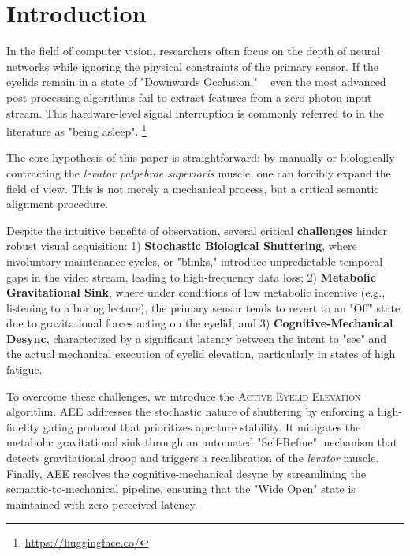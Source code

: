 \section{Introduction}
\label{sec:intro}

In the field of computer vision, researchers often focus on the depth of neural networks while ignoring the physical constraints of the primary sensor. If the eyelids remain in a state of "Downwards Occlusion," ~\citep{chen2025planning, fung2025embodied, terver2025drives, russell2025gaia, agarwal2025cosmos} even the most advanced post-processing algorithms fail to extract features from a zero-photon input stream. This hardware-level signal interruption is commonly referred to in the literature as "being asleep". \footnote{\url{https://huggingface.co/}}

The core hypothesis of this paper is straightforward: by manually or biologically contracting the \textit{levator palpebrae superioris} muscle, one can forcibly expand the field of view. This is not merely a mechanical process, but a critical semantic alignment procedure. ~\citep{alayrac2022flamingo, liu2024improved, dai2023instructblip}

Despite the intuitive benefits of observation, several critical \textbf{challenges} hinder robust visual acquisition: 1) \textbf{Stochastic Biological Shuttering}, where involuntary maintenance cycles, or "blinks," introduce unpredictable temporal gaps in the video stream, leading to high-frequency data loss; 2) \textbf{Metabolic Gravitational Sink}, where under conditions of low metabolic incentive (e.g., listening to a boring lecture), the primary sensor tends to revert to an "Off" state due to gravitational forces acting on the eyelid; and 3) \textbf{Cognitive-Mechanical Desync}, characterized by a significant latency between the intent to "see" and the actual mechanical execution of eyelid elevation, particularly in states of high fatigue.

To overcome these challenges, we introduce the \textsc{Active Eyelid Elevation} algorithm. AEE addresses the stochastic nature of shuttering by enforcing a high-fidelity gating protocol that prioritizes aperture stability. It mitigates the metabolic gravitational sink through an automated "Self-Refine" mechanism that detects gravitational droop and triggers a recalibration of the \textit{levator} muscle. Finally, AEE resolves the cognitive-mechanical desync by streamlining the semantic-to-mechanical pipeline, ensuring that the "Wide Open" state is maintained with zero perceived latency.

